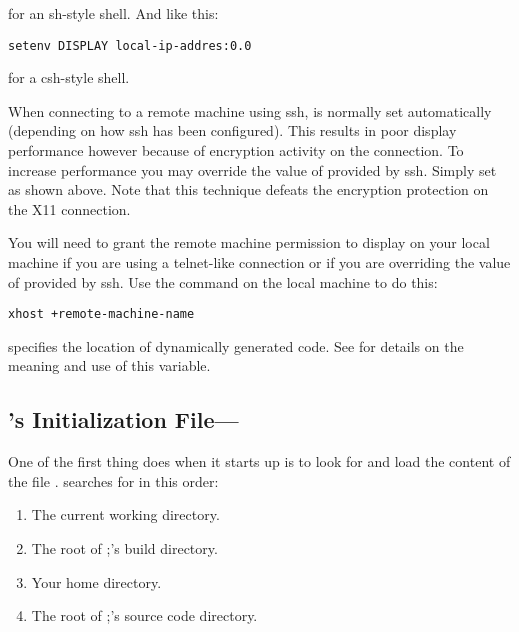 \begin{description}
        for an sh-style shell. And like this:

\begin{verbatim}
setenv DISPLAY local-ip-addres:0.0
\end{verbatim}

        for a csh-style shell.

        When connecting to a remote machine using ssh,  is
        normally set automatically (depending on how ssh has been
        configured).  This results in poor display performance however
        because of encryption activity on the connection.  To increase
        performance you may override the value of  provided
        by ssh.  Simply set  as
        shown above.  Note that this technique defeats the encryption
        protection on the X11 connection.

        You will need to grant the remote machine permission to display on
        your local machine if you are using a telnet-like connection or if
        you are overriding the value of  provided by ssh.
        Use the  command on the local machine to do
        this:

\begin{verbatim}
xhost +remote-machine-name
\end{verbatim}

  \item[\envvar{SCI\_ON\_THE\_FLY\_LIBS\_DIR}\mbox{}: ]\mbox{}
    
     specifies the location of
    dynamically generated code.  See  for details on the meaning and use of
    this variable.

    
\end{description}

\subsection{\sr{}'s Initialization File---}
\label{sec:scirunrc}

One of the first thing \sr{} does when it starts up is to look for and
load the content of the file .  \sr{} searches for
 in this order:

\begin{enumerate}
\item The current working directory.
\item The root of \sr;'s build directory.
\item Your home directory.
\item The root of \sr;'s source code directory.
\end{enumerate}

